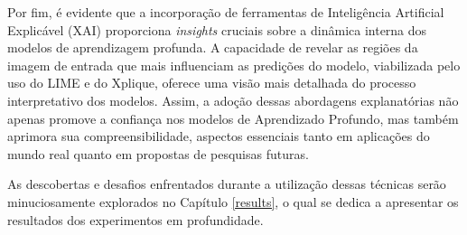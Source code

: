 Por fim, é evidente que a incorporação de ferramentas de Inteligência Artificial Explicável (XAI) proporciona \textit{insights} cruciais sobre a dinâmica interna dos modelos de aprendizagem profunda. A capacidade de revelar as regiões da imagem de entrada que mais influenciam as predições do modelo, viabilizada pelo uso do LIME e do Xplique, oferece uma visão mais detalhada do processo interpretativo dos modelos. Assim, a adoção dessas abordagens explanatórias não apenas promove a confiança nos modelos de Aprendizado Profundo, mas também aprimora sua compreensibilidade, aspectos essenciais tanto em aplicações do mundo real quanto em propostas de pesquisas futuras.

As descobertas e desafios enfrentados durante a utilização dessas técnicas serão minuciosamente explorados no Capítulo \ref{results}, o qual se dedica a apresentar os resultados dos experimentos em profundidade.




